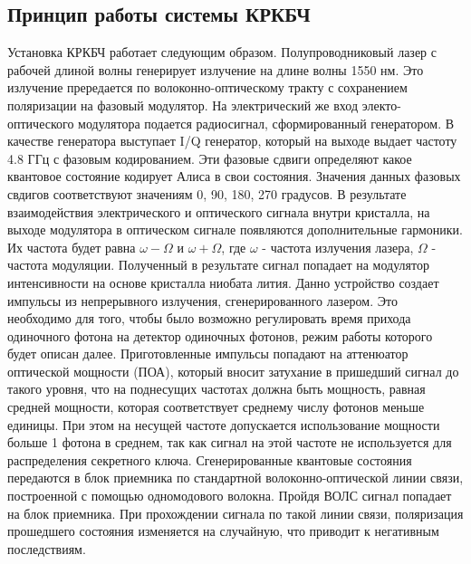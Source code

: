 \subsection*{Принцип работы системы КРКБЧ}
Установка КРКБЧ работает следующим образом. Полупроводниковый лазер с рабочей длиной волны генерирует излучение на длине волны 1550 нм. Это излучение прередается по волоконно-оптическому тракту с сохранением поляризации на фазовый модулятор.
На электрический же вход электо-оптического модулятора подается радиосигнал, сформированный генератором. В качестве генератора выступает I/Q генератор, который на выходе выдает частоту 4.8 ГГц с фазовым кодированием.
Эти фазовые сдвиги определяют какое квантовое состояние кодирует Алиса в свои состояния. Значения данных фазовых свдигов соответствуют значениям {0, 90, 180, 270} градусов. 
В результате взаимодействия электрического и оптического сигнала внутри кристалла, на выходе модулятора в оптическом сигнале появляются дополнительные гармоники. Их частота будет равна $\omega - \Omega$ и $\omega + \Omega$, где $\omega$ - частота излучения лазера, $\Omega$ - частота модуляции.
Полученный в результате сигнал попадает на модулятор интенсивности на основе кристалла ниобата лития. Данно устройство создает импульсы из непрерывного излучения, сгенерированного лазером. Это необходимо для того, чтобы было возможно регулировать время прихода одиночного фотона на детектор одиночных фотонов, режим работы которого будет описан далее.
Приготовленные импульсы попадают на аттенюатор оптической мощности (ПОА), который вносит затухание в пришедший сигнал до такого уровня, что на поднесущих частотах должна быть мощность, равная средней мощности, которая соответствует среднему числу фотонов меньше единицы.
При этом на несущей частоте допускается использование мощности больше 1 фотона в среднем, так как сигнал на этой частоте не используется для распределения секретного ключа.
Сгенерированные квантовые состояния передаются в блок приемника по стандартной волоконно-оптической линии связи, построенной с помощью одномодового волокна. 
Пройдя ВОЛС сигнал попадает на блок приемника. 
При прохождении сигнала по такой линии связи, поляризация прошедшего состояния изменяется на случайную, что приводит к негативным последствиям. 
